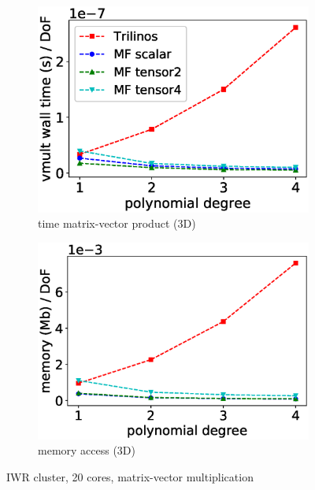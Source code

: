\documentclass[AMA,STIX1COL]{WileyNJD-v2}
\begin{document}
\begin{figure}
\begin{subfigure}[b]{0.32\textwidth}
    \includegraphics[width=\textwidth]{IWR_newest_patched_timing3d.eps}
    \caption{time matrix-vector product (3D)}
    \label{fig:benchmark_miehe_IWR_vmult3}
  \end{subfigure}
  \begin{subfigure}[b]{0.32\textwidth}
    \centering
    \includegraphics[width=\textwidth]{IWR_newest_patched_memory3d-nolables.eps}
    \caption{memory access (3D)}
    \label{fig:benchmark_miehe_IWR_memory3}
  \end{subfigure}
  \caption{IWR cluster, 20 cores, matrix-vector multiplication}%
  \label{fig:benchmark_miehe_IWR}
\end{figure}
\end{document}

